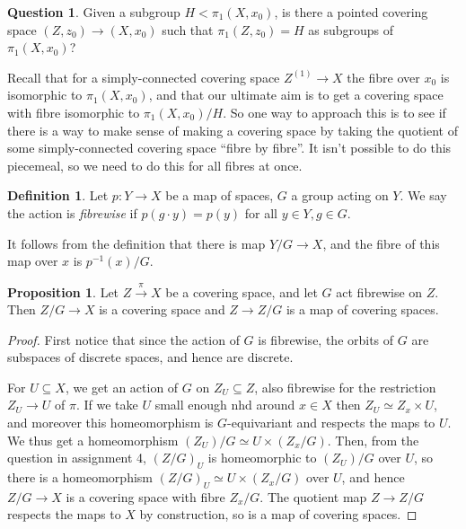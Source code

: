\documentclass{tufte-handout}
\newcommand{\lecturenum}[1]{\marginnote{\color{red}Lecture #1}}
\theoremstyle{definition}
\newtheorem{prop}{Proposition}
\newtheorem{definition}{Definition}
\newtheorem{q}{Question}
\begin{document}
\begin{q}
Given a subgroup $H< \pi_1(X,x_0)$, is there a pointed covering space $(Z,z_0)\to (X,x_0)$ such that $\pi_1(Z,z_0) = H$ as subgroups of $\pi_1(X,x_0)$?
\end{q}


Recall\lecturenum{16} that for a simply-connected covering space $Z^{(1)} \to X$ the fibre over $x_0$ is isomorphic to $\pi_1(X,x_0)$, and that our ultimate aim is to get a covering space with fibre isomorphic to $\pi_1(X,x_0)/H$. So one way to approach this is to see if there is a way to make sense of making a covering space by taking the quotient of some simply-connected covering space ``fibre by fibre''. It isn't possible to do this piecemeal, so we need to do this for all fibres at once.

\begin{definition}
Let $p\colon Y\to X$ be a map of spaces, $G$ a group acting on $Y$. We say the action is \emph{fibrewise} if $p(g\cdot y) = p(y)$ for all $y \in Y,g\in G$.
\end{definition}

It follows from the definition that there is map $Y/G \to X$, and the fibre of this map over $x$ is $p^{-1}(x)/G$.

\begin{prop}
Let $Z\xrightarrow{\pi} X$ be a covering space, and let $G$ act fibrewise on $Z$. Then $Z/G\to X$ is a covering space and $Z\to Z/G$ is a map of covering spaces.
\end{prop}

\begin{proof}
First notice that since the action of $G$ is fibrewise, the orbits of $G$ are subspaces of discrete spaces, and hence are discrete.

For $U\subseteq X$, we get an action of $G$ on $Z_U \subseteq Z$, also fibrewise for the restriction $Z_U \to U$ of $\pi$. If we take $U$ small enough nhd around $x\in X$ then $Z_U \simeq Z_x \times U$, and moreover this homeomorphism is $G$-equivariant and respects the maps to $U$. We thus get a homeomorphism $(Z_U)/G \simeq U \times (Z_x/G)$. Then, from the question in assignment 4, $(Z/G)_U$ is homeomorphic to $(Z_U)/G$ over $U$, so there is a homeomorphism $(Z/G)_U \simeq U \times (Z_x/G)$ over $U$, and hence $Z/G \to X$ is a covering space with fibre $Z_x/G$. The quotient map $Z \to Z/G$ respects the maps to $X$ by construction, so is a map of covering spaces.
\end{proof}
\end{document}
